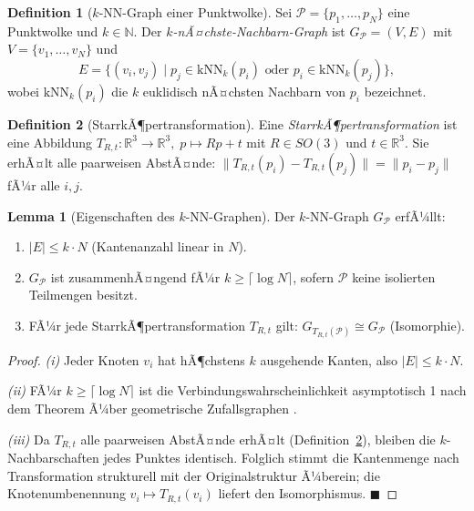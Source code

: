 ﻿\documentclass[a4paper,12pt]{article}
\theoremstyle{definition}
\newtheorem{definition}{Definition}[section]
\newtheorem{lemma}{Lemma}[section]
\begin{document}
\begin{definition}[$k$-NN-Graph einer Punktwolke]
  \label{def:knn_graph}
  Sei $\mathcal{P} = \{p_1, \ldots, p_N\}$ eine Punktwolke und
  $k \in \mathbb{N}$. Der \emph{$k$-nÃ¤chste-Nachbarn-Graph} ist
  $G_\mathcal{P} = (V, E)$ mit $V = \{v_1, \ldots, v_N\}$ und
  \[
    E = \bigl\{(v_i, v_j) \;\big|\;
        p_j \in \mathrm{kNN}_k(p_i) \text{ oder }
        p_i \in \mathrm{kNN}_k(p_j)\bigr\},
  \]
  wobei $\mathrm{kNN}_k(p_i)$ die $k$ euklidisch nÃ¤chsten Nachbarn
  von $p_i$ bezeichnet.
\end{definition}

\begin{definition}[StarrkÃ¶pertransformation]
  \label{def:starr}
  Eine \emph{StarrkÃ¶pertransformation} ist eine Abbildung
  $T_{R,t}: \mathbb{R}^3 \to \mathbb{R}^3,\; p \mapsto Rp + t$
  mit $R \in SO(3)$ und $t \in \mathbb{R}^3$.
  Sie erhÃ¤lt alle paarweisen AbstÃ¤nde:
  $\|T_{R,t}(p_i) - T_{R,t}(p_j)\| = \|p_i - p_j\|$ fÃ¼r alle $i,j$.
\end{definition}

\begin{lemma}[Eigenschaften des $k$-NN-Graphen]
  \label{lem:knn_properties}
  Der $k$-NN-Graph $G_\mathcal{P}$ erfÃ¼llt:
  \begin{enumerate}
    \item $|E| \leq k \cdot N$ (Kantenanzahl linear in $N$).
    \item $G_\mathcal{P}$ ist zusammenhÃ¤ngend fÃ¼r $k \geq
          \lceil \log N \rceil$, sofern $\mathcal{P}$ keine
          isolierten Teilmengen besitzt.
    \item FÃ¼r jede StarrkÃ¶pertransformation $T_{R,t}$ gilt:
          $G_{T_{R,t}(\mathcal{P})} \cong G_\mathcal{P}$
          (Isomorphie).
  \end{enumerate}
\end{lemma}

\begin{proof}
  \emph{(i)} Jeder Knoten $v_i$ hat hÃ¶chstens $k$ ausgehende Kanten,
  also $|E| \leq k \cdot N$.

  \emph{(ii)} FÃ¼r $k \geq \lceil \log N \rceil$ ist die
  Verbindungswahrscheinlichkeit asymptotisch 1 nach dem Theorem
  Ã¼ber geometrische Zufallsgraphen \citep{Penrose2003}.

  \emph{(iii)} Da $T_{R,t}$ alle paarweisen AbstÃ¤nde erhÃ¤lt
  (Definition~\ref{def:starr}), bleiben die $k$-Nachbarschaften
  jedes Punktes identisch. Folglich stimmt die Kantenmenge nach
  Transformation strukturell mit der Originalstruktur Ã¼berein;
  die Knotenumbenennung $v_i \mapsto T_{R,t}(v_i)$ liefert
  den Isomorphismus. \hfill$\blacksquare$
\end{proof}
\end{document}
